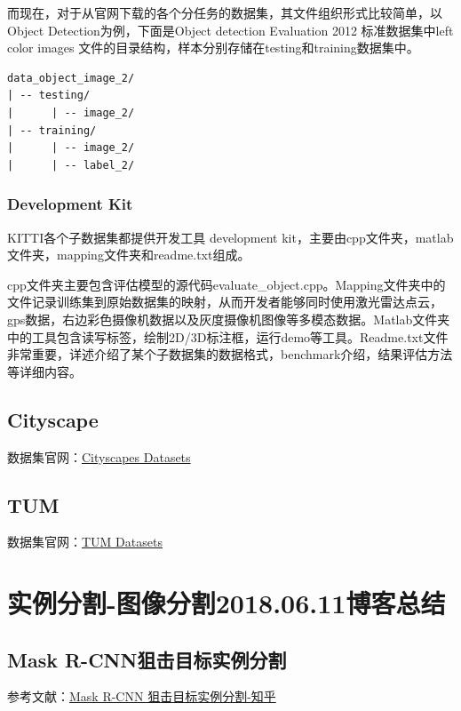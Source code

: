 而现在，对于从官网下载的各个分任务的数据集，其文件组织形式比较简单，以Object Detection为例，下面是Object detection Evaluation 2012 标准数据集中left color images 文件的目录结构，样本分别存储在testing和training数据集中。

\begin{verbatim}
data_object_image_2/
| -- testing/
|      | -- image_2/
| -- training/
|      | -- image_2/
|      | -- label_2/
\end{verbatim}

\subsubsection{Development Kit}

KITTI各个子数据集都提供开发工具 development kit，主要由cpp文件夹，matlab文件夹，mapping文件夹和readme.txt组成。

cpp文件夹主要包含评估模型的源代码evaluate\_object.cpp。Mapping文件夹中的文件记录训练集到原始数据集的映射，从而开发者能够同时使用激光雷达点云，gps数据，右边彩色摄像机数据以及灰度摄像机图像等多模态数据。Matlab文件夹中的工具包含读写标签，绘制2D/3D标注框，运行demo等工具。Readme.txt文件非常重要，详述介绍了某个子数据集的数据格式，benchmark介绍，结果评估方法等详细内容。

\subsection{Cityscape}

数据集官网：\href{https://www.cityscapes-dataset.com/}{Cityscapes Datasets}



\subsection{TUM}

数据集官网：\href{https://vision.in.tum.de/data/datasets}{TUM Datasets}

\section{实例分割-图像分割2018.06.11博客总结}

\subsection{Mask R-CNN狙击目标实例分割}

参考文献：\href{https://zhuanlan.zhihu.com/p/26047813}{Mask R-CNN 狙击目标实例分割-知乎}

